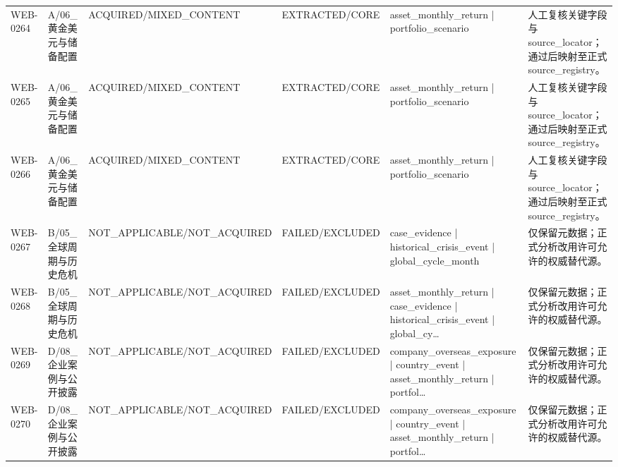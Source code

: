 \begin{landscape}
\begin{longtable}{p{1.8cm}p{2.6cm}p{2.6cm}p{2.6cm}p{4.8cm}p{7.2cm}}
WEB-0264 & A/\allowbreak{}06\_\allowbreak{}黄金美元与储备配置 & ACQUIRED/\allowbreak{}MIXED\_\allowbreak{}CONTENT & EXTRACTED/\allowbreak{}CORE & asset\_\allowbreak{}monthly\_\allowbreak{}return | portfolio\_\allowbreak{}scenario & 人工复核关键字段与source\_\allowbreak{}locator；通过后映射至正式source\_\allowbreak{}registry。\\
WEB-0265 & A/\allowbreak{}06\_\allowbreak{}黄金美元与储备配置 & ACQUIRED/\allowbreak{}MIXED\_\allowbreak{}CONTENT & EXTRACTED/\allowbreak{}CORE & asset\_\allowbreak{}monthly\_\allowbreak{}return | portfolio\_\allowbreak{}scenario & 人工复核关键字段与source\_\allowbreak{}locator；通过后映射至正式source\_\allowbreak{}registry。\\
WEB-0266 & A/\allowbreak{}06\_\allowbreak{}黄金美元与储备配置 & ACQUIRED/\allowbreak{}MIXED\_\allowbreak{}CONTENT & EXTRACTED/\allowbreak{}CORE & asset\_\allowbreak{}monthly\_\allowbreak{}return | portfolio\_\allowbreak{}scenario & 人工复核关键字段与source\_\allowbreak{}locator；通过后映射至正式source\_\allowbreak{}registry。\\
WEB-0267 & B/\allowbreak{}05\_\allowbreak{}全球周期与历史危机 & NOT\_\allowbreak{}APPLICABLE/\allowbreak{}NOT\_\allowbreak{}ACQUIRED & FAILED/\allowbreak{}EXCLUDED & case\_\allowbreak{}evidence | historical\_\allowbreak{}crisis\_\allowbreak{}event | global\_\allowbreak{}cycle\_\allowbreak{}month & 仅保留元数据；正式分析改用许可允许的权威替代源。\\
WEB-0268 & B/\allowbreak{}05\_\allowbreak{}全球周期与历史危机 & NOT\_\allowbreak{}APPLICABLE/\allowbreak{}NOT\_\allowbreak{}ACQUIRED & FAILED/\allowbreak{}EXCLUDED & asset\_\allowbreak{}monthly\_\allowbreak{}return | case\_\allowbreak{}evidence | historical\_\allowbreak{}crisis\_\allowbreak{}event | global\_\allowbreak{}cy… & 仅保留元数据；正式分析改用许可允许的权威替代源。\\
WEB-0269 & D/\allowbreak{}08\_\allowbreak{}企业案例与公开披露 & NOT\_\allowbreak{}APPLICABLE/\allowbreak{}NOT\_\allowbreak{}ACQUIRED & FAILED/\allowbreak{}EXCLUDED & company\_\allowbreak{}overseas\_\allowbreak{}exposure | country\_\allowbreak{}event | asset\_\allowbreak{}monthly\_\allowbreak{}return | portfol… & 仅保留元数据；正式分析改用许可允许的权威替代源。\\
WEB-0270 & D/\allowbreak{}08\_\allowbreak{}企业案例与公开披露 & NOT\_\allowbreak{}APPLICABLE/\allowbreak{}NOT\_\allowbreak{}ACQUIRED & FAILED/\allowbreak{}EXCLUDED & company\_\allowbreak{}overseas\_\allowbreak{}exposure | country\_\allowbreak{}event | asset\_\allowbreak{}monthly\_\allowbreak{}return | portfol… & 仅保留元数据；正式分析改用许可允许的权威替代源。\\

\end{longtable}
\end{landscape}
